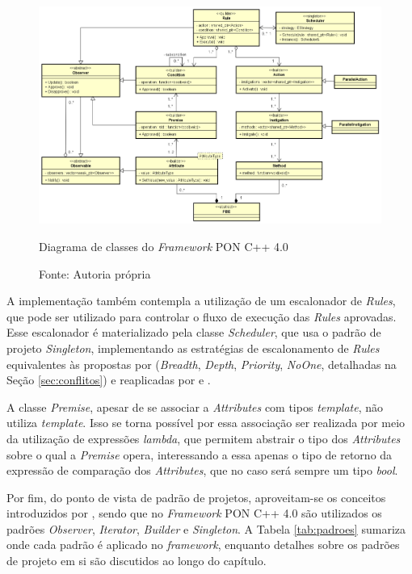 \begin{figure}[!htb]
    \centering
    \includegraphics[width=\textwidth]{../figures/astah_nop4.png}
    \smallskip
    \caption{Diagrama de classes do \textit{Framework} PON C++ 4.0}
    \caption*{Fonte: Autoria própria}
    \label{fig:class_fw4}
\end{figure}

\FloatBarrier

A implementação também contempla a utilização de um escalonador de
\textit{Rules}, que pode ser utilizado para controlar o fluxo de execução das
\textit{Rules} aprovadas. Esse escalonador é materializado pela classe
\textit{Scheduler}, que usa o padrão de projeto \textit{Singleton},
implementando as estratégias de escalonamento de \textit{Rules} equivalentes às
propostas por  (\textit{Breadth},
\textit{Depth}, \textit{Priority}, \textit{NoOne}, detalhadas na Seção
\ref{sec:conflitos}) e reaplicadas por  e
.

A classe \textit{Premise}, apesar de se associar a \textit{Attributes} com tipos
\textit{template}, não utiliza \textit{template}. Isso se torna possível por
essa associação ser realizada por meio da utilização de expressões
\textit{lambda}, que permitem abstrair o tipo dos \textit{Attributes} sobre o
qual a \textit{Premise} opera, interessando a essa apenas o tipo de retorno da
expressão de comparação dos \textit{Attributes}, que no caso será sempre um tipo
\textit{bool}.

Por fim, do ponto de vista de padrão de projetos, aproveitam-se os conceitos
introduzidos por , sendo que no \textit{Framework}
PON C++ 4.0 são utilizados os padrões \textit{Observer}, \textit{Iterator},
\textit{Builder} e \textit{Singleton}. A Tabela \ref{tab:padroes} sumariza onde
cada padrão é aplicado no \textit{framework}, enquanto detalhes sobre os padrões
de projeto em si são discutidos ao longo do capítulo.

